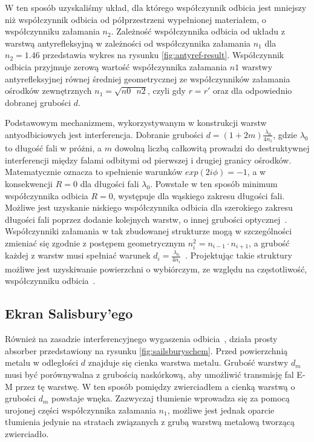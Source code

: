  W ten sposób uzyskaliśmy układ, dla którego współczynnik odbicia jest mniejszy niż współczynnik odbicia od półprzestrzeni wypełnionej materiałem, o współczynniku załamania $n_2$. Zależność współczynnika odbicia od układu z warstwą antyrefleksyjną w zależności od współczynnika załamania $n_1$ dla $n_2=1.46$ przedstawia wykres na rysunku \ref{fig:antyref-result}. Współczynnik odbicia przyjmuje zerową wartość współczynnika załamania $n1$ warstwy antyrefleksyjnej równej średniej geometrycznej ze współczynników załamania ośrodków zewnętrznych $n_1=\sqrt{n0\textrm{ }n2}$, czyli gdy $r=r'$ oraz dla odpowiednio dobranej grubości $d$.

Podstawowym mechanizmem, wykorzystywanym w konstrukcji warstw antyodbiciowych jest interferencja. Dobranie grubości $d=(1+2m)\frac{\lambda_0}{4 n_1}$, gdzie $\lambda_0$ to długość fali w próżni, a $m$ dowolną liczbą całkowitą prowadzi do destruktywnej interferencji między falami odbitymi od pierwszej i drugiej granicy ośrodków. Matematycznie oznacza to spełnienie warunków $exp(2 i \phi)=-1$, a w konsekwencji $R=0$ dla długości fali $\lambda_0$. Powstałe w ten sposób minimum współczynnika odbicia $R=0$, występuje dla wąskiego zakresu długości fali. Możliwe jest uzyskanie niskiego współczynnika odbicia dla szerokiego zakresu długości fali poprzez dodanie kolejnych warstw, o innej grubości optycznej~\cite{poitras2004toward}. Współczynniki załamania w tak zbudowanej strukturze mogą w szczególności zmieniać się zgodnie z postępem geometrycznym $n_i^2=n_{i-1} \cdot n_{i+1}$, a grubość każdej z warstw musi spełniać warunek $d_i=\frac{\lambda_0}{4 n_i}$~\cite{pochi1988optical}. Projektując takie struktury możliwe jest uzyskiwanie powierzchni o wybiórczym, ze względu na częstotliwość, współczynniku odbicia~\cite{monacelli2005infrared}. 

\subsection{Ekran Salisbury'ego}
Również na zasadzie interferencyjnego wygaszenia odbicia~\cite{us1952absorbent}, działa prosty absorber przedstawiony na rysunku \ref{fig:sailsburyschem}. Przed powierzchnią metalu w odległości $d$ znajduje się cienka warstwa metalu. Grubość warstwy $d_m$ musi być porównywalna z grubością naskórkową, aby umożliwić transmisję fal E-M przez tę warstwę. W ten sposób pomiędzy zwierciadłem a cienką warstwą o grubości $d_m$ powstaje wnęka. Zazwyczaj tłumienie wprowadza się za pomocą urojonej części współczynnika załamania $n_1$, możliwe jest jednak oparcie tłumienia jedynie na stratach związanych z grubą warstwą metalową tworzącą zwierciadło. 

